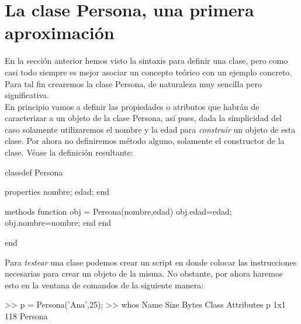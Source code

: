 \section{La clase Persona, una primera aproximación}

En la sección anterior hemos visto la sintaxis para definir una clase,
pero como casi todo siempre es mejor asociar un concepto teórico con un
ejemplo concreto. Para tal fin crearemos la clase Persona, de naturaleza
muy sencilla pero significativa. \\

En principio vamos a definir las propiedades o atributos que habrán de
caracterizar a un objeto de la clase Persona, así pues, dada la
simplicidad del caso solamente utilizaremos el nombre y la edad para
\emph{construir} un objeto de esta clase. Por ahora no definiremos
método alguno, solamente el constructor de la clase. Véase la definición
resultante:

\begin{matlab}
classdef Persona
    
    properties %
        nombre;
        edad;
    end
    
    methods
        function obj = Persona(nombre,edad) %
            obj.edad=edad;
            obj.nombre=nombre;
        end
    end
    
end
\end{matlab}

Para \emph{testear} una clase podemos crear un script en donde colocar
las instrucciones necesarias para crear un objeto de la misma. No
obstante, por ahora haremos esto en la ventana de comandos de la
siguiente manera:

\begin{matlab}
>> p = Persona('Ana',25);
>> whos
  Name      Size            Bytes  Class      Attributes
  p         1x1               118  Persona        
\end{matlab}
